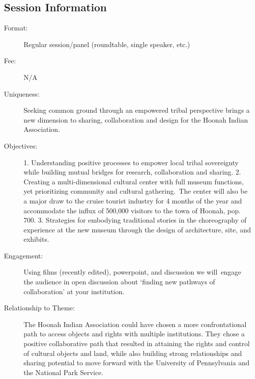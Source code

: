 \documentclass{report}
\begin{document}
              \subsection*{Session Information}
                \begin{description}
                  \item [Format:] Regular session/panel (roundtable, single speaker, etc.)
							    
								  \item [Fee:]N/A
							     
							    \item [Uniqueness:]Seeking common ground through an empowered tribal perspective brings a new dimension to sharing, collaboration and design for the Hoonah Indian Association.
							    \item [Objectives:]1. Understanding positive processes to empower local tribal sovereignty while building mutual bridges for research, collaboration and sharing. 
2. Creating a multi-dimensional cultural center with full museum functions, yet prioritizing community and cultural gathering. The center will also be a major draw to the cruise tourist industry for 4 months of the year and accommodate the influx of 500,000 visitors to the town of Hoonah, pop. 700.
3. Strategies for embodying traditional stories in the choreography of experience at the new museum through the design of architecture, site, and exhibits.
							    \item [Engagement:]Using films (recently edited), powerpoint, and discussion we will engage the audience in open discussion about ‘finding new pathways of collaboration’ at your institution.
							    \item [Relationship to Theme:]The Hoonah Indian Association could have chosen a more confrontational path to access objects and rights with multiple institutions. They chose a positive collaborative path that resulted in attaining the rights and control of cultural objects and land, while also building strong relationships and sharing potential to move forward with the University of Pennsylvania and the National Park Service.
							    
                \end{description}
\end{document}
